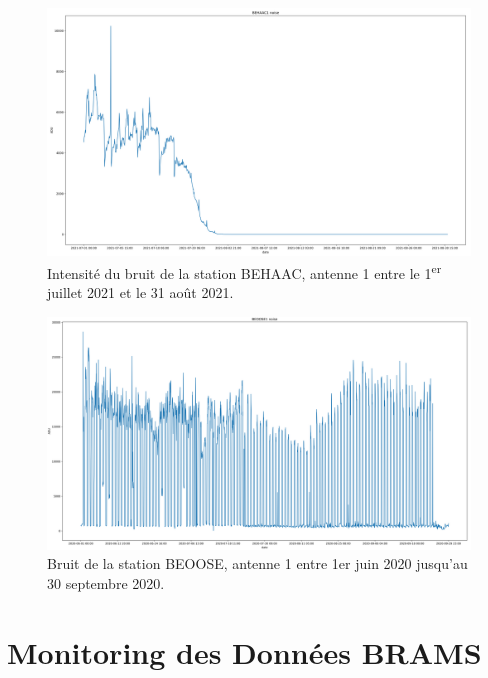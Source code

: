 \documentclass[11pt]{article}
\begin{document}
\begin{figure}[t]
    \begin{center}
        \includegraphics[scale=0.235]{BEHAAC1_2021-07-01_2021-08-31_noise.png}
        \caption{Intensité du bruit de la station BEHAAC, antenne 1 entre le 1\textsuperscript{er} juillet 2021 et le 31 août 2021.}
        \label{fig:BEHAAC-anomalie}
    \end{center}
\end{figure}

\begin{figure}[t]
    \begin{center}
        \includegraphics[scale=0.23]{BEOOSE1_2020-06-01_2020-09-30_noise.png}
        \caption{Bruit de la station BEOOSE, antenne 1 entre 1er juin 2020 jusqu'au 30 septembre 2020.}
        \label{fig:BEOOSE-anomalie}
    \end{center}
\end{figure}

\section{Monitoring des Données BRAMS} \label{sec:monitoring}
\end{document}

